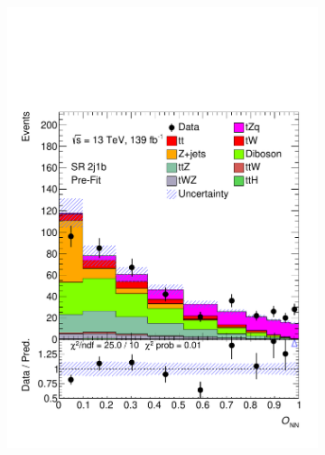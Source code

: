 \begin{figure}[!h] 
  \begin{subfigure}[b]{0.33\linewidth}
    \centering
    \includegraphics[width=\textwidth]{ubonn-thesis/Chapters/Chapters_07/Figure/Data/SR_2j1b.pdf} 
  \end{subfigure}%
  \begin{subfigure}[b]{0.33\linewidth}
    \centering

\end{subfigure}
\end{figure}
